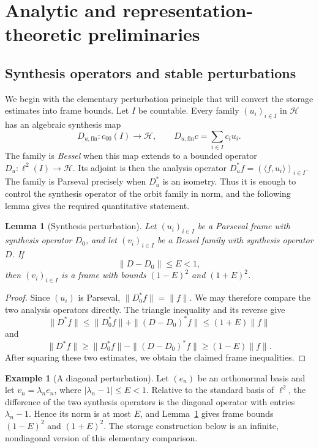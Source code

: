\documentclass[reqno]{amsart}
\numberwithin{equation}{section}
\newtheorem{lemma}[theorem]{Lemma}
\theoremstyle{definition}
\newtheorem{example}[theorem]{Example}
\theoremstyle{remark}
\newcommand{\cH}{\mathcal H}
\begin{document}
\section{Analytic and representation-theoretic preliminaries}
\label{sec:preliminaries}

\subsection{Synthesis operators and stable perturbations}

We begin with the elementary perturbation principle that will convert the
storage estimates into frame bounds.  Let $I$ be countable.  Every family
$(u_i)_{i\in I}$ in $\cH$ has an
algebraic synthesis map
\[
 D_{u,\mathrm{fin}}:c_{00}(I)\longrightarrow\cH,
 \qquad D_{u,\mathrm{fin}}c=\sum_{i\in I}c_i u_i.
\]
The family is \emph{Bessel} when this map extends to a bounded operator
$D_u:\ell^2(I)\to\cH$.  Its adjoint is then the analysis operator
$D_u^*f=(\langle f,u_i\rangle)_{i\in I}$.  The family is Parseval precisely
when $D_u^*$ is an isometry.  Thus it is enough to control the synthesis
operator of the orbit family in norm, and the following lemma gives the
required quantitative statement.

\begin{lemma}[Synthesis perturbation]
\label{lem:synthesis-perturbation}
Let $(u_i)_{i\in I}$ be a Parseval frame with synthesis operator $D_0$, and
let $(v_i)_{i\in I}$ be a Bessel family with synthesis operator $D$.  If
\begin{equation}\label{eq:synthesis-perturbation-hypothesis}
   \|D-D_0\|\leq E<1,
\end{equation}
then $(v_i)_{i\in I}$ is a frame with bounds $(1-E)^2$ and $(1+E)^2$.
\end{lemma}

\begin{proof}
Since $(u_i)$ is Parseval, $\|D_0^*f\|=\|f\|$.  We may therefore compare the
two analysis operators directly.  The triangle inequality and its reverse
give
\[
 \|D^*f\|
 \leq \|D_0^*f\|+\|(D-D_0)^*f\|
 \leq (1+E)\|f\|
\]
and
\[
 \|D^*f\|
 \geq \|D_0^*f\|-\|(D-D_0)^*f\|
 \geq (1-E)\|f\|.
\]
After squaring these two estimates, we obtain the claimed frame inequalities.
\end{proof}

\begin{example}[A diagonal perturbation]\label{ex:diagonal-perturbation}
Let $(e_n)$ be an orthonormal basis and let
$v_n=\lambda_ne_n$, where $|\lambda_n-1|\leq E<1$.  Relative to the standard
basis of $\ell^2$, the difference of the two synthesis operators is the
diagonal operator with entries $\lambda_n-1$.  Hence its norm is at most
$E$, and Lemma~\ref{lem:synthesis-perturbation} gives frame bounds
$(1-E)^2$ and $(1+E)^2$.  The storage construction below is an infinite,
nondiagonal version of this elementary comparison.
\end{example}
\end{document}
